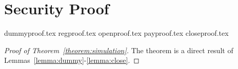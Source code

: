 \section{Security Proof}
  \label{appendix:secproof}
  {dummyproof.tex}
  {regproof.tex}
  {openproof.tex}
  {payproof.tex}
  {closeproof.tex}

  \begin{proof}[Proof of Theorem~\ref{theorem:simulation}]
    The theorem is a direct result of
    Lemmas~\ref{lemma:dummy}-\ref{lemma:close}.
  \end{proof}
